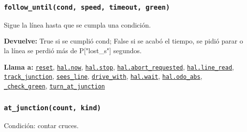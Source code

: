 \subsubsection{\texttt{follow\_\allowbreak{}until(cond, speed, timeout, green)}}\label{fn:linefollow:follow-until}
\noindent Sigue la línea hasta que se cumpla una condición.

\par{}\par\smallskip
\noindent\textbf{Devuelve:} True si se cumplió cond; False si se acabó el tiempo, se pidió parar o la línea se perdió más de P["lost\_s"] segundos.\par
\noindent\textbf{Llama a:} \hyperref[fn:linefollow:reset]{\texttt{reset}}, \hyperref[fn:hal:now]{\texttt{hal.now}}, \hyperref[fn:hal:stop]{\texttt{hal.stop}}, \hyperref[fn:hal:abort-requested]{\texttt{hal.abort\_\allowbreak{}requested}}, \hyperref[fn:hal:line-read]{\texttt{hal.line\_\allowbreak{}read}}, \hyperref[fn:linefollow:track-junction]{\texttt{track\_\allowbreak{}junction}}, \hyperref[fn:linefollow:sees-line]{\texttt{sees\_\allowbreak{}line}}, \hyperref[fn:linefollow:drive-with]{\texttt{drive\_\allowbreak{}with}}, \hyperref[fn:hal:wait]{\texttt{hal.wait}}, \hyperref[fn:hal:odo-abs]{\texttt{hal.odo\_\allowbreak{}abs}}, \hyperref[fn:linefollow:-check-green]{\texttt{\_\allowbreak{}check\_\allowbreak{}green}}, \hyperref[fn:linefollow:turn-at-junction]{\texttt{turn\_\allowbreak{}at\_\allowbreak{}junction}}\par

\subsubsection{\texttt{at\_\allowbreak{}junction(count, kind)}}\label{fn:linefollow:at-junction}
\noindent Condición: contar cruces.

